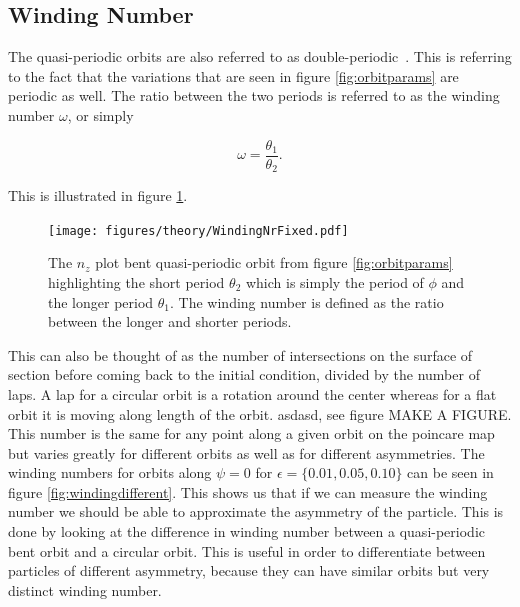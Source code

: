 \subsection{Winding Number} \label{sec:winding}
The quasi-periodic orbits are also referred to as double-periodic~\cite{Yarin}. This is referring to the fact that the variations that are seen in figure \ref{fig:orbitparams} are periodic as well. The ratio between the two periods is referred to as the winding number $\omega$, or simply

\begin{equation}\label{eq:winding}
\omega = \frac{\theta_1}{\theta_2}.
\end{equation}

This is illustrated in figure \ref{fig:windingDef}.

\begin{figure}[H]
\begin{center}
\texttt{[image: figures/theory/WindingNrFixed.pdf]}
\end{center}
\caption{The $n_z$ plot bent quasi-periodic orbit from figure \ref{fig:orbitparams} highlighting the short period $\theta_2$ which is simply the period of $\phi$ and the longer period $\theta_1$. The winding number is defined as the ratio between the longer and shorter periods.}
\label{fig:windingDef}
\end{figure}

This can also be thought of as the number of intersections on the surface of section before coming back to the initial condition, divided by the number of laps. A lap for a circular orbit is a rotation around the center whereas for a flat orbit it is moving along length of the orbit. asdasd, see figure MAKE A FIGURE. This number is the same for any point along a given orbit on the 
poincare map but varies greatly for different orbits as well as for different asymmetries. The winding numbers for
 orbits along $\psi=0$ for $\epsilon=\{0.01, 0.05, 0.10\}$ can be seen in figure \ref{fig:windingdifferent}. This shows us that if we can measure the winding number we should be able to approximate the asymmetry of the particle.  This is done by looking at the difference in winding number between a quasi-periodic bent orbit and a circular orbit. This is useful in order to differentiate between particles of different asymmetry, because they can have similar orbits but very distinct winding number. 
 
